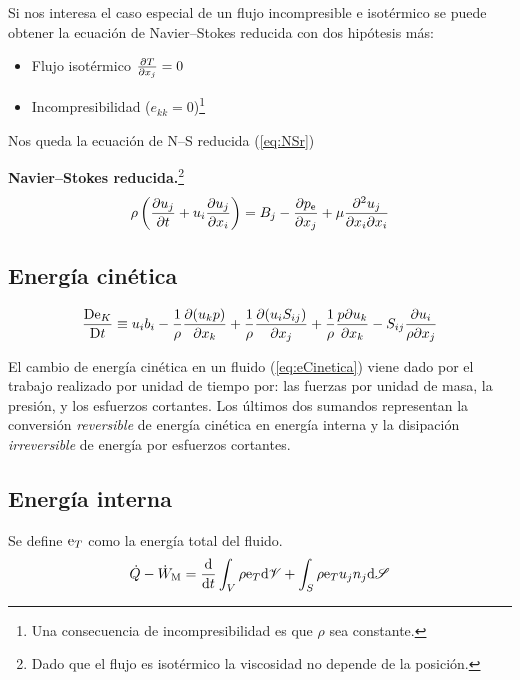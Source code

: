 Si nos interesa el caso especial de un flujo incompresible e isotérmico se puede obtener la ecuación de Navier--Stokes reducida con dos hipótesis más:
\begin{itemize}
    \item Flujo isotérmico $\frac{\partial T}{\partial x_j}=0$
    \item Incompresibilidad ($e_{kk}=0$)\footnote{Una consecuencia de incompresibilidad es que $\rho$ sea constante.}
\end{itemize}
Nos queda la ecuación de N--S reducida (\ref{eq:NSr})
\begin{mdframed}
\textbf{Navier--Stokes reducida.}\footnote{Dado que el flujo es isotérmico la viscosidad no depende de la posición.}
\begin{equation}\label{eq:NSr}
\rho \left( \spartial{u_j}{t} +u_i \spartial{u_j}{x_i}\right)=B_j-\spartial{\pe}{x_j} +\mu \spartial{^2 u_j}{x_i\partial x_i}
\end{equation}
\end{mdframed}



\subsection{Energía cinética}

\begin{equation}\label{eq:eCinetica}
\frac{\textrm{D} \textrm{e}_K}{\textrm{D} t}\equiv u_i b_i-\frac{1}{\rho}\frac{\partial (u_k p)}{\partial x_k} +\frac{1}{\rho} \frac{\partial (u_i S_{ij})}{\partial x_j}+\frac{1}{\rho} \frac{p\partial u_k}{\partial x_k}-S_{ij} \frac{\partial u_i}{\rho \partial x_j}
\end{equation}

El cambio de energía cinética en un fluido (\ref{eq:eCinetica}) viene dado por el trabajo realizado por unidad de tiempo por: las fuerzas por unidad de masa, la presión, y los esfuerzos cortantes. Los últimos dos sumandos representan la conversión \emph{reversible} de energía cinética en energía interna y la disipación \emph{irreversible} de energía por esfuerzos cortantes.
\subsection{Energía interna}
Se define $\textrm{e}_T$ como la energía total del fluido.
\begin{equation}\label{eq:etotal}
    \dot{Q}-\dot{W}_\textrm{M}=\frac{\textrm{d} }{\textrm{d} t}\int_V \rho \textrm{e}_T \textrm{d} \mathscr{V} +\int_S \rho \textrm{e}_T u_j n_j \textrm{d} \mathscr{S}
\end{equation}

